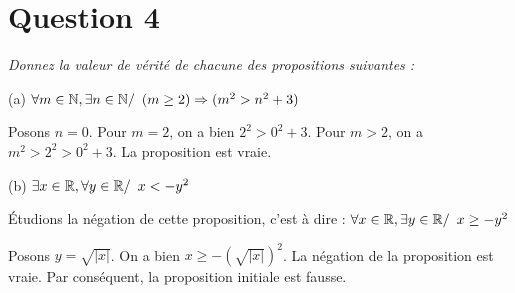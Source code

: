 \section*{Question 4}

\noindent
\emph{Donnez la valeur de vérité de chacune des propositions suivantes :}

\bigskip
\noindent
(a) \(\forall m \in \mathbb{N}, \exists n \in \mathbb{N} / \enskip (m \geq 2) \Rightarrow (m^2 > n^2 + 3)\)

\medskip
\noindent
Posons $n = 0$. Pour $m = 2$, on a bien $2^2 > 0^2 + 3$. Pour $m > 2$, on a $m^2 > 2^2 > 0^2 + 3$. La proposition est vraie.

\bigskip
\noindent
(b) \(\exists x \in \mathbb{R}, \forall y \in \mathbb{R} / \enskip x < -y^2\)

\medskip
\noindent
Étudions la négation de cette proposition, c’est à dire : \(\forall x \in \mathbb{R}, \exists y \in \mathbb{R} / \enskip x \geq -y^2\)

\medskip
\noindent
Posons $y = \sqrt{|x|}$. On a bien \( x \geq - (\sqrt{|x|})^2\). La négation de la proposition est vraie. Par conséquent, la proposition initiale est fausse. 

